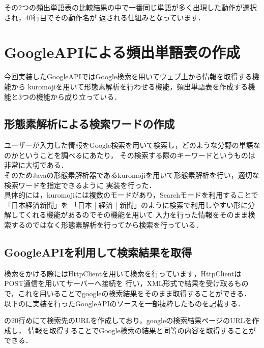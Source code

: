 その2つの頻出単語表の比較結果の中で一番同じ単語が多く出現した動作が選択され，40行目でその動作名が
返される仕組みとなっています．\\




\section{GoogleAPIによる頻出単語表の作成}
今回実装したGoogleAPIではGoogle検索を用いてウェブ上から情報を取得する機能から
kuromojiを用いて形態素解析を行わせる機能，頻出単語表を作成する機能と3つの機能から成り立っている．\\
\subsection{形態素解析による検索ワードの作成}
ユーザーが入力した情報をGoogle検索を用いて検索し，どのような分野の単語なのかということを調べるにあたり，
その検索する際のキーワードというものは非常に大切である．\\

そのためJavaの形態素解析器であるkuromojiを用いて形態素解析を行い，適切な検索ワードを指定できるように
実装を行った．\\

具体的には，kuromojiには複数のモードがあり，Searchモードを利用することで「日本経済新聞」を
「日本 | 経済 | 新聞」のように検索で利用しやすい形に分解してくれる機能があるのでその機能を用いて
入力を行った情報をそのまま検索するのではなく形態素解析を行ってから検索を行っている．\\



\subsection{GoogleAPIを利用して検索結果を取得}
検索をかける際にはHttpClientを用いて検索を行っています，HttpClientはPOST通信を用いてサーバーへ接続を
行い，XML形式で結果を受け取るもので，これを用いることでgoogleの検索結果をそのまま取得することができる．\\

以下のに実装を行ったGoogleAPIのソースを一部抜粋したものを記載する．

の20行めにて検索先のURLを作成しており，googleの検索結果ページのURLを作成し，
情報を取得することでGoogle検索の結果と同等の内容を取得することができる．\\

